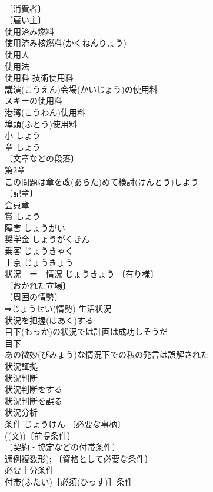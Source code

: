 \documentclass[8pt]{extreport}
\begin{document}
\begin{CJK}{UTF8}{min}
\\	〔消費者〕
\\	〔雇い主〕
\\	使用済み燃料 
\\	使用済み核燃料(かくねんりょう) 
\\	使用人 
\\	使用法 
\\	使用料 技術使用料 
\\	講演(こうえん)会場(かいじょう)の使用料 
\\	スキーの使用料 
\\	港湾(こうわん)使用料 
\\	埠頭(ふとう)使用料 
\\	小	しょう	
\\	章	しょう	
\\	〔文章などの段落〕
\\	第2章 
\\	この問題は章を改(あらた)めて検討(けんとう)しよう 
\\	〔記章〕
\\	会員章 
\\	賞	しょう	
\\	障害	しょうがい	
\\	奨学金	しょうがくきん	
\\	乗客	じょうきゃく	
\\	上京	じょうきょう	
\\	状況　ー　情況	じょうきょう	〔有り様〕
\\	〔おかれた立場〕
\\	〔周囲の情勢〕
\\	⇒じょうせい(情勢) 生活状況 
\\	状況を把握(はあく)する 
\\	目下(もっか)の状況では計画は成功しそうだ 
\\	目下　
\\	あの微妙(びみょう)な情況下での私の発言は誤解された 
\\	状況証拠 
\\	状況判断 
\\	状況判断をする 
\\	状況判断を誤る 
\\	状況分析 
\\	条件	じょうけん	〔必要な事柄〕
\\	((文))〔前提条件〕
\\	〔契約・協定などの付帯条件〕
\\	通例複数形); 〔資格として必要な条件〕
\\	必要十分条件 
\\	付帯(ふたい)［必須(ひっす)］条件 

\end{CJK}
\end{document}
